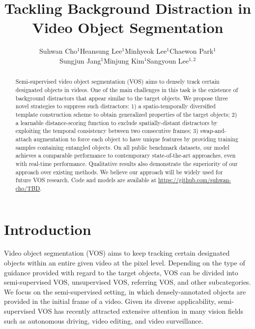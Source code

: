 \documentclass[runningheads]{llncs}
\begin{document}
\pagestyle{headings}
\mainmatter
\def\ECCVSubNumber{4697}  

\title{Tackling Background Distraction in\\Video Object Segmentation} 





\author{Suhwan Cho$^1$\quad Heansung Lee$^1$\quad Minhyeok Lee$^1$\quad Chaewon Park$^1$\\Sungjun Jang$^1$\quad Minjung Kim$^1$\quad Sangyoun Lee$^{1,2}$}
\maketitle



\begin{abstract}
Semi-supervised video object segmentation (VOS) aims to densely track certain designated objects in videos. One of the main challenges in this task is the existence of background distractors that appear similar to the target objects. We propose three novel strategies to suppress such distractors: 1) a spatio-temporally diversified template construction scheme to obtain generalized properties of the target objects; 2) a learnable distance-scoring function to exclude spatially-distant distractors by exploiting the temporal consistency between two consecutive frames; 3) swap-and-attach augmentation to force each object to have unique features by providing training samples containing entangled objects. On all public benchmark datasets, our model achieves a comparable performance to contemporary state-of-the-art approaches, even with real-time performance. Qualitative results also demonstrate the superiority of our approach over existing methods. We believe our approach will be widely used for future VOS research. Code and models are available at \url{https://github.com/suhwan-cho/TBD}.

\end{abstract}


\section{Introduction}
Video object segmentation (VOS) aims to keep tracking certain designated objects within an entire given video at the pixel level. Depending on the type of guidance provided with regard to the target objects, VOS can be divided into semi-supervised VOS, unsupervised VOS, referring VOS, and other subcategories. We focus on the semi-supervised setting, in which densely-annotated objects are provided in the initial frame of a video. Given its diverse applicability, semi-supervised VOS has recently attracted extensive attention in many vision fields such as autonomous driving, video editing, and video surveillance.
\end{document}
